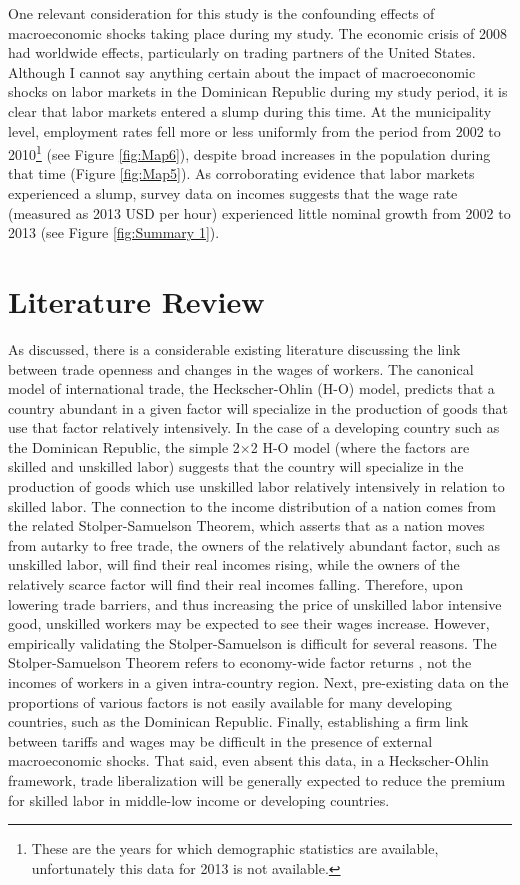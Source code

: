 \documentclass[12pt]{article}
\begin{document}
One relevant consideration for this study is the confounding effects of macroeconomic shocks 
taking place during my study. The economic crisis of 2008 had worldwide effects, particularly
on trading partners of the United States. Although I cannot say anything certain about the impact
of macroeconomic shocks on labor markets in the Dominican Republic during my study period, 
it is clear that labor markets entered a slump during this time. At the municipality level, employment
rates fell more or less uniformly from the period from 2002 to 2010\footnote{These are the years for
which demographic statistics are available, unfortunately this data for 2013 is not available.} (see
Figure \ref{fig:Map6}), despite broad increases in the population during that time (Figure \ref{fig:Map5}).
As corroborating evidence that labor markets experienced a slump, survey data on incomes suggests
that the wage rate (measured as 2013 USD per hour) experienced little nominal growth from 
2002 to 2013 (see Figure \ref{fig:Summary 1}).

\vspace{-10pt}
\section{Literature Review}
\label{sec:Litreview}
As discussed, there is a considerable existing literature discussing the link between trade openness
and changes in the wages of workers.
The canonical model of international trade, the Heckscher-Ohlin (H-O) model, 
predicts that a country abundant in a given factor will specialize 
in the production of goods that use that factor relatively intensively.
In the case of a developing country such as the Dominican Republic, the 
simple 2$\times$2 H-O model (where the factors are skilled and unskilled labor) suggests that the 
country will specialize in the production of goods
which use unskilled labor relatively intensively in relation to skilled labor. 
The connection to the income distribution of a nation comes from the related Stolper-Samuelson Theorem,
which asserts that as a nation moves from autarky to free trade, the owners of the relatively
abundant factor, such as unskilled labor, will find their real incomes rising, while the owners of
the relatively scarce factor will find their real incomes falling. 
Therefore, upon lowering trade barriers, and thus increasing the price of unskilled labor intensive
good, unskilled workers may be expected to see their wages
increase. However, empirically validating the Stolper-Samuelson is difficult for several reasons. 
The Stolper-Samuelson Theorem refers to economy-wide factor returns \citep{goldberg}, not the 
incomes of workers in a  given intra-country region. Next, pre-existing data on the  proportions
of various factors is not easily available for many developing countries, such as the Dominican Republic.
Finally, establishing a firm link between tariffs and wages may be difficult in the presence of external
macroeconomic shocks. That said, even absent this data, in a Heckscher-Ohlin framework, trade 
liberalization will be generally expected to reduce the premium for skilled labor in middle-low 
income or developing countries. 
\end{document}
